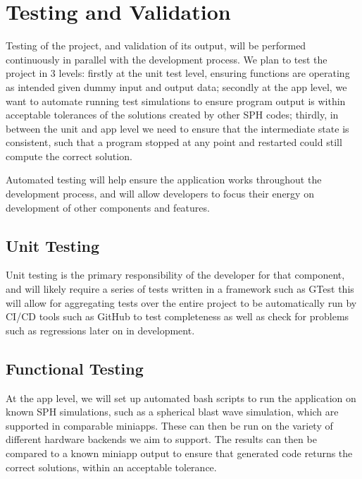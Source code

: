 \chapter{Testing and Validation}
Testing of the project, and validation of its output, will be performed continuously in parallel with the development process. We plan to test the project in 3 levels: firstly at the unit test level, ensuring functions are operating as intended given dummy input and output data; secondly at the app level, we want to automate running test simulations to ensure program output is within acceptable tolerances of the solutions created by other SPH codes; thirdly, in between the unit and app level we need to ensure that the intermediate state is consistent, such that a program stopped at any point and restarted could still compute the correct solution.

Automated testing will help ensure the application works throughout the development process, and will allow developers to focus their energy on development of other components and features. 

\section{Unit Testing}
Unit testing is the primary responsibility of the developer for that component, and will likely require a series of tests written in a framework such as GTest \cite{gtest}
this will allow for aggregating tests over the entire project to be automatically run by CI/CD tools such as GitHub to test completeness as well as check for problems such as regressions later on in development.

\section{Functional Testing}
At the app level, we will set up automated bash scripts to run the application on known SPH simulations, such as a spherical blast wave simulation, which are supported in comparable miniapps. These can then be run on the variety of different hardware backends we aim to support. The results can then be compared to a known miniapp output to ensure that generated code returns the correct solutions, within an acceptable tolerance. 

